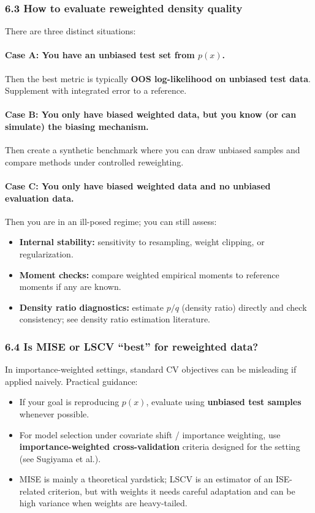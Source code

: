 \documentclass[twocolumn]{notes}
\begin{document}
\subsubsection{6.3 How to evaluate reweighted density quality}
There are three distinct situations:

\paragraph{Case A: You have an unbiased test set from $p(x)$.}
Then the best metric is typically \textbf{OOS log-likelihood on unbiased test data}. Supplement with integrated error to a reference.

\paragraph{Case B: You only have biased weighted data, but you know (or can simulate) the biasing mechanism.}
Then create a synthetic benchmark where you can draw unbiased samples and compare methods under controlled reweighting.

\paragraph{Case C: You only have biased weighted data and no unbiased evaluation data.}
Then you are in an ill-posed regime; you can still assess:
\begin{itemize}[leftmargin=2em]
\item \textbf{Internal stability:} sensitivity to resampling, weight clipping, or regularization.
\item \textbf{Moment checks:} compare weighted empirical moments to reference moments if any are known.
\item \textbf{Density ratio diagnostics:} estimate $p/q$ (density ratio) directly and check consistency; see density ratio estimation literature.
\end{itemize}

\subsubsection{6.4 Is MISE or LSCV ``best'' for reweighted data?}
In importance-weighted settings, standard CV objectives can be misleading if applied naively. Practical guidance:
\begin{itemize}[leftmargin=2em]
\item If your goal is reproducing $p(x)$, evaluate using \textbf{unbiased test samples} whenever possible.
\item For model selection under covariate shift / importance weighting, use \textbf{importance-weighted cross-validation} criteria designed for the setting (see Sugiyama et al.).
\item MISE is mainly a theoretical yardstick; LSCV is an estimator of an ISE-related criterion, but with weights it needs careful adaptation and can be high variance when weights are heavy-tailed.
\end{itemize}
\end{document}
